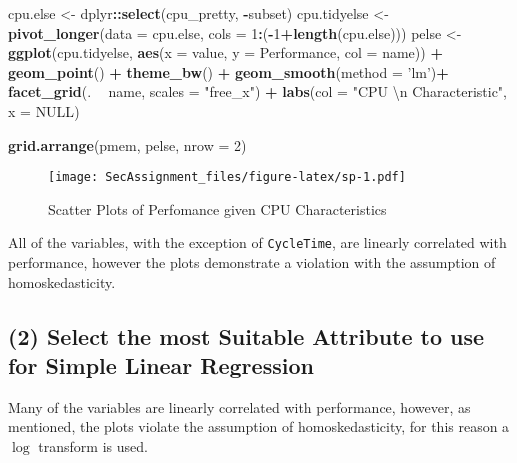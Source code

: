 \documentclass[12pt]{article}
\newenvironment{Shaded}{\begin{snugshade}}{\end{snugshade}}
\newcommand{\CharTok}[1]{\textcolor[rgb]{0.31,0.60,0.02}{#1}}
\newcommand{\DataTypeTok}[1]{\textcolor[rgb]{0.13,0.29,0.53}{#1}}
\newcommand{\DecValTok}[1]{\textcolor[rgb]{0.00,0.00,0.81}{#1}}
\newcommand{\KeywordTok}[1]{\textcolor[rgb]{0.13,0.29,0.53}{\textbf{#1}}}
\newcommand{\NormalTok}[1]{#1}
\newcommand{\OperatorTok}[1]{\textcolor[rgb]{0.81,0.36,0.00}{\textbf{#1}}}
\newcommand{\OtherTok}[1]{\textcolor[rgb]{0.56,0.35,0.01}{#1}}
\newcommand{\StringTok}[1]{\textcolor[rgb]{0.31,0.60,0.02}{#1}}
\begin{document}
\begin{Shaded}
\begin{Highlighting}[]
\NormalTok{cpu.else <-}\StringTok{ }\NormalTok{dplyr}\OperatorTok{::}\KeywordTok{select}\NormalTok{(cpu_pretty, }\OperatorTok{-}\NormalTok{subset)}
\NormalTok{cpu.tidyelse <-}\StringTok{ }\KeywordTok{pivot_longer}\NormalTok{(}\DataTypeTok{data =}\NormalTok{ cpu.else, }\DataTypeTok{cols =} \DecValTok{1}\OperatorTok{:}\NormalTok{(}\OperatorTok{-}\DecValTok{1}\OperatorTok{+}\KeywordTok{length}\NormalTok{(cpu.else)))}
\NormalTok{pelse <-}\StringTok{ }\KeywordTok{ggplot}\NormalTok{(cpu.tidyelse, }\KeywordTok{aes}\NormalTok{(}\DataTypeTok{x =}\NormalTok{ value, }\DataTypeTok{y =}\NormalTok{ Performance, }\DataTypeTok{col =}\NormalTok{ name)) }\OperatorTok{+}
\StringTok{  }\KeywordTok{geom_point}\NormalTok{() }\OperatorTok{+}\StringTok{ }
\StringTok{  }\KeywordTok{theme_bw}\NormalTok{() }\OperatorTok{+}
\StringTok{  }\KeywordTok{geom_smooth}\NormalTok{(}\DataTypeTok{method =} \StringTok{'lm'}\NormalTok{)}\OperatorTok{+}
\StringTok{  }\KeywordTok{facet_grid}\NormalTok{(. }\OperatorTok{~}\StringTok{ }\NormalTok{name, }\DataTypeTok{scales =} \StringTok{"free_x"}\NormalTok{) }\OperatorTok{+}\StringTok{ }
\StringTok{  }\KeywordTok{labs}\NormalTok{(}\DataTypeTok{col =} \StringTok{"CPU }\CharTok{\textbackslash{}n}\StringTok{ Characteristic"}\NormalTok{, }\DataTypeTok{x =} \OtherTok{NULL}\NormalTok{)}

\KeywordTok{grid.arrange}\NormalTok{(pmem, pelse, }\DataTypeTok{nrow =} \DecValTok{2}\NormalTok{)}
\end{Highlighting}
\end{Shaded}

\begin{figure}
\centering
\texttt{[image: SecAssignment\_files/figure-latex/sp-1.pdf]}
\caption{Scatter Plots of Perfomance given CPU Characteristics}
\end{figure}

All of the variables, with the exception of \texttt{CycleTime}, are
linearly correlated with performance, however the plots demonstrate a
violation with the assumption of homoskedasticity.

\hypertarget{select-the-most-suitable-attribute-to-use-for-simple-linear-regression}{%
\subsection{(2) Select the most Suitable Attribute to use for Simple
Linear
Regression}\label{select-the-most-suitable-attribute-to-use-for-simple-linear-regression}}

Many of the variables are linearly correlated with performance, however,
as mentioned, the plots violate the assumption of homoskedasticity, for
this reason a \(\log\) transform is used.
\end{document}
